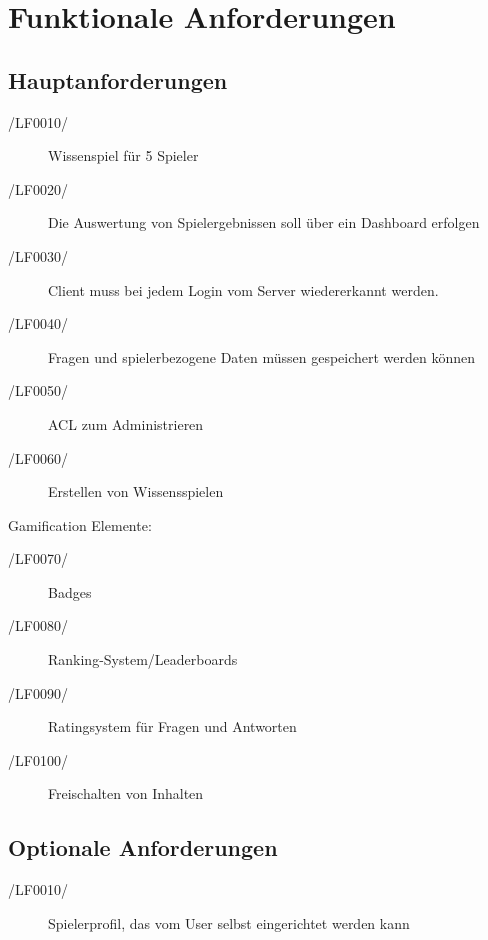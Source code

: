 \documentclass[11pt,a4paper]{scrreprt}
\begin{document}
\chapter{Funktionale Anforderungen}
\section{Hauptanforderungen}
\begin{description}
\item[/LF0010/] Wissenspiel für 5 Spieler
\item[/LF0020/] Die Auswertung von Spielergebnissen soll über ein Dashboard erfolgen
\item[/LF0030/] Client muss bei jedem Login vom Server wiedererkannt werden.
\item[/LF0040/] Fragen und spielerbezogene Daten müssen gespeichert werden können
\item[/LF0050/] ACL zum Administrieren
\item[/LF0060/] Erstellen von Wissensspielen
\end{description}
Gamification Elemente:
\begin{description}
\item[/LF0070/] Badges
\item[/LF0080/] Ranking-System/Leaderboards 
\item[/LF0090/] Ratingsystem für Fragen und Antworten
\item[/LF0100/] Freischalten von Inhalten
\end{description}
\section{Optionale Anforderungen}
\begin{description}
\item[/LF0010/] Spielerprofil, das vom User selbst eingerichtet werden kann
\end{description}
\end{document}
